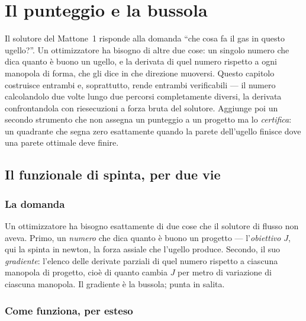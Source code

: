 \chapter{Il punteggio e la bussola}
\label{ch:score}

Il solutore del Mattone~1 risponde alla domanda ``che cosa fa il gas
in questo ugello?''. Un ottimizzatore ha bisogno di altre due cose:
un singolo numero che dica quanto è buono un ugello, e la derivata
di quel numero rispetto a ogni manopola di forma, che gli dice in
che direzione muoversi. Questo capitolo costruisce entrambi e,
soprattutto, rende entrambi verificabili --- il numero calcolandolo
due volte lungo due percorsi completamente diversi, la derivata
confrontandola con riesecuzioni a forza bruta del solutore. Aggiunge
poi un secondo strumento che non assegna un punteggio a un progetto
ma lo \emph{certifica}: un quadrante che segna zero esattamente
quando la parete dell'ugello finisce dove una parete ottimale deve
finire.

\section{Il funzionale di spinta, per due vie}

\subsection{La domanda}

Un ottimizzatore ha bisogno esattamente di due cose che il solutore
di flusso non aveva. Primo, un \emph{numero} che dica quanto è buono
un progetto --- l'\emph{obiettivo} $J$, qui la spinta in newton, la
forza assiale che l'ugello produce. Secondo, il suo
\emph{gradiente}: l'elenco delle derivate parziali di quel numero
rispetto a ciascuna manopola di progetto, cioè di quanto cambia $J$
per metro di variazione di ciascuna manopola. Il gradiente è la
bussola; punta in salita.

\subsection{Come funziona, per esteso}

